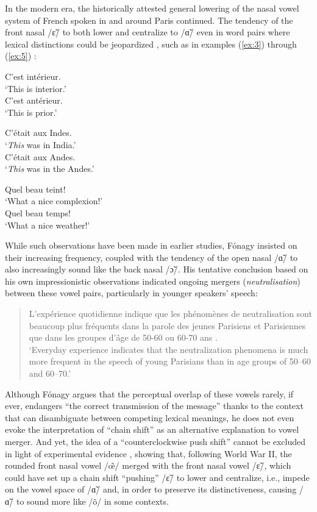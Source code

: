 \documentclass[output=paper,colorlinks,citecolor=brown]{langscibook}
\begin{document}
In the modern era, the historically attested general lowering of the nasal vowel system of French spoken in and around Paris continued.   The tendency of the front nasal /ɛ̃/ to both lower and centralize to /ɑ̃/ even in word pairs where lexical distinctions could be jeopardized \citep[][]{Fónagy1989}, such as in examples (\ref{ex:3}) through (\ref{ex:5}) :

\ea \label{ex:3}
\ea  C’est intérieur.\\`This is interior.'\\
\ex C’est antérieur.\\ `This is prior.'\\
\z
\z

\ea \label{ex:4}
\ea C’était aux Indes.\\`\textit{This} was in India.'\\
\ex C’était aux Andes.\\`\textit{This} was in the Andes.'\\
\z
\z

\ea \label{ex:5}
\ea Quel beau teint! \\ `What a nice complexion!'\\
\ex Quel beau temps! \\ `What a nice weather!'\\
\z
\z


While such observations have been made in earlier studies, Fónagy insisted on their increasing frequency, coupled with the tendency of the open nasal /ɑ̃/ to also increasingly sound like the back nasal /ɔ̃/. His tentative conclusion based on his own impressionistic observations indicated ongoing mergers (\textit{neutralisation}) between these vowel pairs, particularly in younger speakers’ speech:
\begin{quote}
    L’expérience quotidienne indique que les phénomènes de neutralisation sont beaucoup plus fréquents dans la parole des jeunes Parisiens et Parisiennes que dans les groupes d'\^age de 50-60 ou 60-70 ans \citep[][232]{Fónagy1989}. \\‘Everyday experience indicates that the neutralization phenomena is much more frequent in the speech of young Parisians than in age groups of 50--60 and 60--70.’
\end{quote}
Although Fónagy argues that the perceptual overlap of these vowels rarely, if ever, endangers “the correct transmission of the message” \citep[][228]{Fónagy1989} thanks to the context that can disambiguate between competing lexical meanings, he does not even evoke the interpretation of ``chain shift'' as an alternative explanation to vowel merger. And yet, the idea of a ``counterclockwise push shift'' cannot be excluded in light of experimental evidence \citep[][]{Malécot1976}, showing that, following World War II, the rounded front nasal vowel /œ̃/ merged with the front nasal vowel /ɛ̃/, which could have set up a chain shift ``pushing'' /ɛ̃/ to lower and centralize, i.e., impede on the vowel space of /ɑ̃/ and, in order to preserve its distinctiveness, causing /ɑ̃/ to sound more like /õ/ in some contexts.
\end{document}
